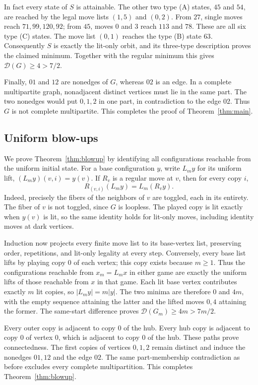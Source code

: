 \documentclass[11pt]{article}
\begin{document}
In fact every state of $S$ is attainable. The other two type (A) states,
$45$ and $54$, are reached by the legal move lists $(1,5)$ and $(0,2)$.
From $27$, single moves reach $71,99,120,92$; from $45$, moves $0$ and
$3$ reach $113$ and $78$. These are all six type (C) states. The move
list $(0,1)$ reaches the type (B) state $63$. Consequently $S$ is exactly
the lit-only orbit, and its three-type description proves the claimed
minimum. Together with the regular minimum this gives
$\mathcal D(G)\geq4>7/2$.

Finally, $01$ and $12$ are nonedges of $G$, whereas $02$ is an edge.
In a complete multipartite graph, nonadjacent distinct vertices must lie
in the same part. The two nonedges would put $0,1,2$ in one part, in
contradiction to the edge $02$. Thus $G$ is not complete multipartite.
This completes the proof of Theorem~\ref{thm:main}.


\subsection*{Uniform blow-ups}
We prove Theorem~\ref{thm:blowup} by identifying all configurations
reachable from the uniform initial state. For a base configuration $y$,
write $L_m y$ for its uniform lift, $(L_m y)(v,i)=y(v)$. If $R_v$ is a
regular move at $v$, then for every copy $i$,
\[
 R_{(v,i)}(L_m y)=L_m(R_v y).
\]
Indeed, precisely the fibers of the neighbors of $v$ are toggled, each
in its entirety. The fiber of $v$ is not toggled, since $G$ is loopless.
The played copy is lit exactly when $y(v)$ is lit, so the same identity
holds for lit-only moves, including identity moves at dark vertices.

Induction now projects every finite move list to its base-vertex list,
preserving order, repetitions, and lit-only legality at every step.
Conversely, every base list lifts by playing copy $0$ of each vertex;
this copy exists because $m\geq1$. Thus the configurations reachable
from $x_m=L_mx$ in either game are exactly the uniform lifts of those
reachable from $x$ in that game. Each lit base vertex contributes exactly
$m$ lit copies, so $|L_my|=m|y|$. The two minima are therefore $0$ and
$4m$, with the empty sequence attaining the latter and the lifted moves
$0,4$ attaining the former. The same-start difference proves
$\mathcal D(G_m)\geq4m>7m/2$.

Every outer copy is adjacent to copy $0$ of the hub. Every hub copy is
adjacent to copy $0$ of vertex $0$, which is adjacent to copy $0$ of the
hub. These paths prove connectedness. The first copies of vertices
$0,1,2$ remain distinct and induce the nonedges $01,12$ and the edge
$02$. The same part-membership contradiction as before excludes every
complete multipartition. This completes Theorem~\ref{thm:blowup}.
\end{document}
